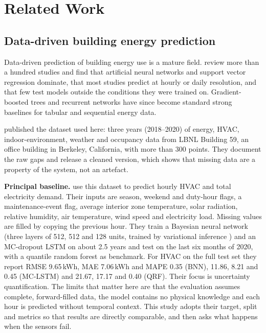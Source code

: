 \section{Related Work}\label{sec:lit}

\subsection{Data-driven building energy prediction}
Data-driven prediction of building energy use is a mature field. \citet{amasyali2018review} review more than a hundred studies and find that artificial neural networks and support vector regression dominate, that most studies predict at hourly or daily resolution, and that few test models outside the conditions they were trained on. Gradient-boosted trees \citep{chen2016xgboost} and recurrent networks \citep{hochreiter1997lstm,cho2014gru} have since become standard strong baselines for tabular and sequential energy data.

\citet{luo2022dataset} published the dataset used here: three years (2018--2020) of energy, HVAC, indoor-environment, weather and occupancy data from LBNL Building 59, an office building in Berkeley, California, with more than 300 points. They document the raw gaps and release a cleaned version, which shows that missing data are a property of the system, not an artefact.

\textbf{Principal baseline.} \citet{mahajan2024bnn} use this dataset to predict hourly HVAC and total electricity demand. Their inputs are season, weekend and duty-hour flags, a maintenance-event flag, average interior zone temperature, solar radiation, relative humidity, air temperature, wind speed and electricity load. Missing values are filled by copying the previous hour. They train a Bayesian neural network (three layers of 512, 512 and 128 units, trained by variational inference \citep{blundell2015weight}) and an MC-dropout LSTM \citep{gal2016dropout} on about 2.5 years and test on the last six months of 2020, with a quantile random forest as benchmark. For HVAC on the full test set they report RMSE 9.65\,kWh, MAE 7.06\,kWh and MAPE 0.35 (BNN), 11.86, 8.21 and 0.45 (MC-LSTM) and 21.67, 17.17 and 0.40 (QRF). Their focus is uncertainty quantification. The limits that matter here are that the evaluation assumes complete, forward-filled data, the model contains no physical knowledge and each hour is predicted without temporal context. This study adopts their target, split and metrics so that results are directly comparable, and then asks what happens when the sensors fail.

